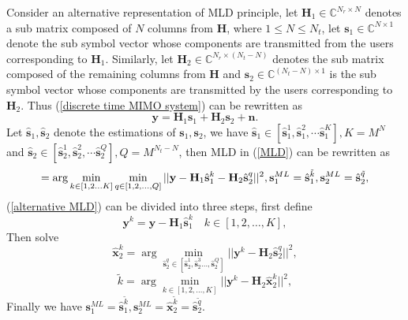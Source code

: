 \documentclass[12pt, draftclsnofoot, onecolumn]{IEEEtran}
\begin{document}
Consider an alternative representation of MLD principle, let $\mathbf{H}_{1}\in \mathbb{C}^{N_{r}\times N}$ denotes a sub matrix composed of $N$ columns from $\mathbf{H}$, where $1\leq N\leq N_{t}$, let $\mathbf{s}_{1}\in \mathbb{C}^{N\times 1}$ denote the sub symbol vector whose components are transmitted from the users corresponding to $\mathbf{H}_{1}$. Similarly, let $\mathbf{H}_{2}\in \mathbb{C}^{N_{r}\times (N_{t}-N)}$ denotes the sub matrix composed of the remaining columns from $\mathbf{H}$ and $\mathbf{s}_{2}\in \mathbb{C}^{(N_{t}-N)\times 1}$ is the sub symbol vector whose components are transmitted by the users corresponding to $\mathbf{H}_{2}$. Thus (\ref{discrete time MIMO system}) can be rewritten as 
\begin{equation}
\mathbf{y}=\mathbf{H}_{1}\mathbf{s}_{1}+\mathbf{H}_{2}\mathbf{s}_{2}+\mathbf{n}.
\label{alternative MIMO system}
\end{equation}  
Let $\hat{\mathbf{s}}_{1}, \hat{\mathbf{s}}_{2}$ denote the estimations of $\mathbf{s}_{1}, \mathbf{s}_{2}$, we have $\hat{\mathbf{s}}_{1}\in [\hat{\mathbf{s}}^{1}_{1}, \hat{\mathbf{s}}^{2}_{1}, \cdots \hat{\mathbf{s}}^{K}_{1}], K=M^{N}$ and $\hat{\mathbf{s}}_{2}\in [\hat{\mathbf{s}}^{1}_{2}, \hat{\mathbf{s}}^{2}_{2}, \cdots \hat{\mathbf{s}}^{Q}_{2}], Q=M^{N_{t}-N}$, then MLD in (\ref{MLD}) can be rewritten as 
\begin{equation}
[\tilde{k}, \tilde{q}]=\arg\min_{k\in [1,2\ldots K]}\min_{q\in [1,2,\ldots, Q]}||\mathbf{y}-\mathbf{H}_{1}\hat{\mathbf{s}}^{k}_{1}-\mathbf{H}_{2}\hat{\mathbf{s}}^{q}_{2}||^{2},\\
\mathbf{s}^{ML}_{1}=\hat{\mathbf{s}}^{\tilde{k}}_{1}, \mathbf{s}^{ML}_{2}=\hat{\mathbf{s}}^{\tilde{q}}_{2},
\label{alternative MLD}
\end{equation}
(\ref{alternative MLD}) can be divided into three steps, first define 
\begin{equation}
\mathbf{y}^{k}=\mathbf{y}-\mathbf{H}_{1}\hat{\mathbf{s}}^{k}_{1}\quad k\in [1,2,\ldots, K],
\label{first step alternative MLD}
\end{equation}
Then solve 
\begin{equation}
\hat{\mathbf{x}}_{2}^{k}=\arg\min_{\hat{\mathbf{s}}_{2}^{q}\in [\hat{\mathbf{s}}_{2}^{1},\hat{\mathbf{s}}_{2}^{3}\ldots, \hat{\mathbf{s}}_{2}^{Q}]}||\mathbf{y}^{k}-\mathbf{H}_{2}\hat{\mathbf{s}}_{2}^{q}||^{2}, 
\label{second step alternative MLD}
\end{equation}
\begin{equation}
\tilde{k}=\arg\min_{k\in [1,2,\ldots, K]}||\mathbf{y}^{k}-\mathbf{H}_{2}\hat{\mathbf{x}}_{2}^{k}||^{2},
\label{third step alternative MLD}
\end{equation}
Finally we have $\mathbf{s}_{1}^{ML}=\hat{\mathbf{s}}_{1}^{\tilde{k}}, \mathbf{s}_{2}^{ML}=\hat{\mathbf{x}}_{2}^{\tilde{k}}=\hat{\mathbf{s}}_{2}^{\tilde{q}}$.
\end{document}
